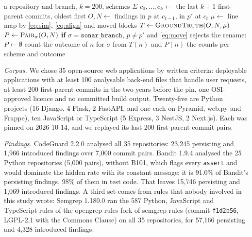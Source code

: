 \documentclass[conference]{IEEEtran}
\begin{document}
\begin{algorithm}[t]
\caption{Replaying and scoring one repository}\label{alg:replay}
\small
\algrenewcommand\algorithmicindent{1em}
\begin{algorithmic}[1]
\Require a repository and branch, $k = 200$, schemes $\Sigma$
\State $c_0, \dots, c_k \gets$ the last $k+1$ first-parent commits, oldest first
    \State $O, N \gets$ findings in $p$ at $c_{t-1}$, in $p'$ at $c_t$
    \State $\mu \gets$ line map by \eqref{eq:sim}, \eqref{eq:align} and moved blocks
    \State $T \gets \textsc{GroundTruth}(O, N, \mu)$
    \ForAll{$\sigma \in \Sigma$}
      \State $P \gets \textsc{Pair}_\sigma(O, N)$
      \State \textbf{if} $\sigma = \texttt{sonar\_branch}$, $p \ne p'$ and
        \eqref{eq:move} rejects the rename: $P \gets \emptyset$
        \State count the outcome of $n$ for $\sigma$ from $T(n)$ and $P(n)$
      \EndFor
    \EndFor
  \EndFor
\EndFor
\State \Return the counts per scheme and outcome
\end{algorithmic}
\end{algorithm}

\textit{Corpus.} We chose 35 open-source web applications by written criteria:
deployable applications with at least 100 analysable back-end files that handle user
requests, at least 200 first-parent commits in the two years before the pin, one
OSI-approved licence and no committed build output. Twenty-five are Python projects (16 Django, 4 Flask, 2 FastAPI, and one each on
Pyramid, web.py and Frappe), ten JavaScript or TypeScript (5 Express, 3 NestJS,
2 Next.js). Each was pinned on 2026-10-14, and we replayed its last 200 first-parent
commit pairs.

\textit{Findings.} CodeGuard 2.2.0 analysed all 35 repositories: 23,245 persisting and
1,966 introduced findings over 7,000 commit pairs. Bandit 1.9.4 analysed the 25 Python
repositories (5,000 pairs), without B101, which flags every \texttt{assert} and would
dominate the hidden rate with its constant message: it is 91.0\% of Bandit's persisting
findings, 98\% of them in test code. That leaves 15,746 persisting and 1,069 introduced
findings. A third set comes from rules that nobody involved in this study wrote: Semgrep
1.180.0 ran the 587 Python, JavaScript and TypeScript rules of the opengrep-rules fork of
semgrep-rules (commit \texttt{f1d2b56}, LGPL-2.1 with the Commons Clause) on all 35
repositories, for 57,166 persisting and 4,328 introduced findings.
\end{document}
